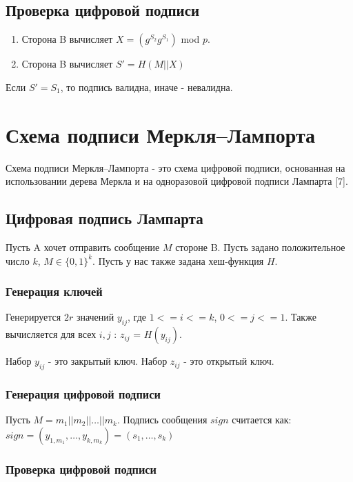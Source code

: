 \documentclass[colorthm]{./civarticle}
\begin{document}
\subsection{Проверка цифровой подписи}

\begin{enumerate}
    \item Сторона B вычисляет $X=(g^{S_2}g^{S_1}) $ mod $p$.
    \item Сторона B вычисляет $S'=H(M||X)$
\end{enumerate}

Если $S' = S_1$, то подпись валидна, иначе - невалидна.

\section{Схема подписи Меркля–Лампорта}
Схема подписи Меркля–Лампорта - это схема цифровой подписи, основанная на использовании дерева Меркла и на одноразовой цифровой подписи Лампарта [7].

\subsection{Цифровая подпись Лампарта}

Пусть A хочет отправить сообщение $M$ стороне B. Пусть задано положительное число $k$, $M \in \{0, 1\}^k$. Пусть у нас также задана хеш-функция $H$. 

\subsubsection{Генерация ключей}

Генерируется $2r$ значений $y_{ij}$, где $1<=i<=k$, $0<=j<=1$. Также вычисляется для всех $i,j$ : $z_{ij}$ = $H(y_{ij})$.

Набор $y_{ij}$ - это закрытый ключ.
Набор $z_{ij}$ - это открытый ключ.

\subsubsection{Генерация цифровой подписи}

Пусть $M=m_1||m_2||\ldots||m_k$.
Подпись сообщения $sign$ считается как: $sign=(y_{1, m_1}, \ldots, y_{k, m_k})=(s_1, \ldots, s_k)$

\subsubsection{Проверка цифровой подписи}
\end{document}
